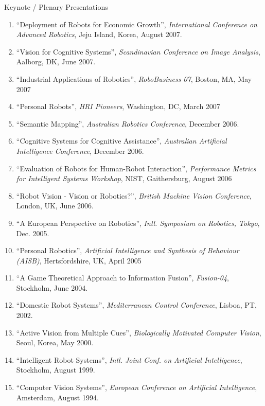 \documentclass{article}
\begin{document}
\begin{cv}
\begin{cvlist}{Keynote / Plenary Presentations}
\begin{enumerate}
			\item ``Deployment of Robots for Economic Growth'', {\em
					      International Conference on Advanced Robotics}, Jeju Island,
			      Korea, August 2007.
			\item ``Vision for Cognitive Systems'', {\em Scandinavian Conference
					      on Image Analysis}, Aalborg, DK, June 2007.
			\item ``Industrial Applications of Robotics'', {\em RoboBusiness
					      07}, Boston, MA, May 2007
			\item ``Personal Robots'', {\em HRI Pioneers}, Washington, DC, March
			      2007
			\item ``Semantic Mapping'', {\em Australian Robotics Conference},
			      December 2006.
			\item ``Cognitive Systems for Cognitive Assistance'', {\em
					      Australian Artificial Intelligence Conference}, December 2006.
			\item ``Evaluation of Robots for Human-Robot Interaction'', {\em
					      Performance Metrics for Intelligent Systems Workshop}, NIST,
			      Gaithersburg, August 2006
			\item ``Robot Vision - Vision or Robotics?'', {\em British Machine
					      Vision Conference}, London, UK, June 2006.
			\item ``A European Perspective on Robotics'', {\em Intl. Symposium
					      on Robotics, Tokyo}, Dec. 2005.
			\item ``Personal Robotics'', {\em Artificial Intelligence and
					      Synthesis of Behaviour (AISB)}, Hertsfordshire, UK, April 2005
			\item ``A Game Theoretical Approach to Information Fusion'', {\em
					      Fusion-04}, Stockholm, June 2004.
			\item ``Domestic Robot Systems'', {\em Mediterranean Control
					      Conference}, Lisboa, PT, 2002.
			\item ``Active Vision from Multiple Cues'', {\em Biologically
					      Motivated Computer Vision}, Seoul, Korea, May 2000.
			\item ``Intelligent Robot Systems'', {\em Intl. Joint Conf. on Artificial
					      Intelligence}, Stockholm, August 1999.
			\item ``Computer Vision Systems'', {\em European Conference on
					      Artificial Intelligence}, Amsterdam, August 1994.
		\end{enumerate}
	\end{cvlist}


\end{cv}
\end{document}
